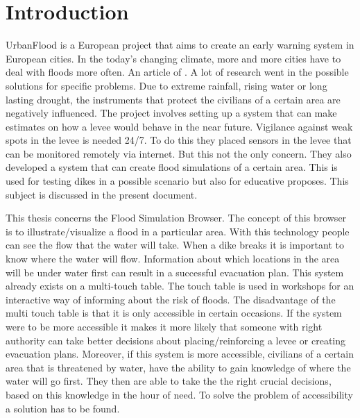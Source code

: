 
\section{Introduction}
UrbanFlood is a European project that aims to create an early warning system in European cities\cite{UrbanFlood}. In the today's changing climate, more and more cities have to deal with floods more often. An article of \cite{floodarticle}. A lot of research went in the possible solutions for specific problems. Due to extreme rainfall, rising water or long lasting drought, the instruments that protect the civilians of a certain area are negatively influenced. The project involves setting up a system that can make estimates on how a levee would behave in the near future. Vigilance against weak spots in the levee is needed 24/7. To do this they placed sensors in the levee that can be monitored remotely via internet. But this not the only concern. They also developed a system that can create flood simulations of a certain area. This is used for testing dikes in a possible scenario but also for educative proposes. This subject is discussed in the present document.

This thesis concerns the Flood Simulation Browser. The concept of this browser is to illustrate/visualize a flood in a particular area. With this technology people can see the flow that the water will take. When a dike breaks it is important to know where the water will flow. Information about which locations in the area will be under water first can result in a successful evacuation plan. This system already exists on a multi-touch table\cite{touchtable}. The touch table is used in workshops for an interactive way of informing about the risk of floods. The disadvantage of the multi touch table is that it is only accessible in certain occasions. If the system were to be more accessible it makes it more likely that someone with right authority can take
better decisions about placing/reinforcing a levee or creating evacuation plans. Moreover, if this system is more accessible, civilians of a certain area that is threatened by water, have the ability to gain knowledge of where the water will go first. They then are able to take the the right crucial decisions, based on this knowledge in the hour of need. To solve the problem of accessibility a solution has to be found.

